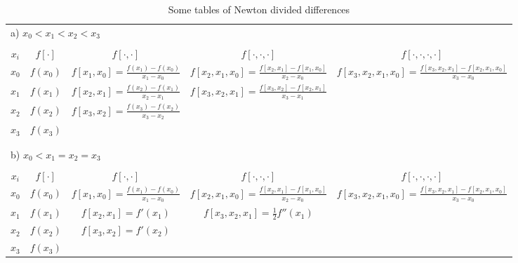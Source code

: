 \begin{table}
\begin{sideways}
\begin{tabular}{ccccc}
\multicolumn{5}{l}{a) $x_0 < x_1 <x_2 < x_3$} \\
&&&&\\
$\displaystyle x_i$ & $\displaystyle f[\cdot] $ &
$\displaystyle f[\cdot,\cdot]$ &
$\displaystyle f[\cdot,\cdot,\cdot]$ &
$\displaystyle f[\cdot,\cdot,\cdot,\cdot]$ \\
\hline
\rule{0em}{2em} $\displaystyle x_0$ & \multicolumn{1}{|c}{$\displaystyle
  f(x_0)$} &
\multicolumn{1}{|c}{$\displaystyle f[x_1,x_0] =
  \frac{f(x_1)-f(x_0)}{x_1-x_0}$} &
\multicolumn{1}{|c}{$\displaystyle
  f[x_2,x_1,x_0]=\frac{f[x_2,x_1]-f[x_1,x_0]}{x_2-x_0}$} &
\multicolumn{1}{|c|}{$\displaystyle f[x_3,x_2,x_1,x_0] =
\frac{f[x_3,x_2,x_1]-f[x_2,x_1,x_0]}{x_3-x_0}$} \\[1em]
\cline{2-5}
\rule{0em}{2em} $\displaystyle x_1$ & $\displaystyle f(x_1)$ &
$\displaystyle f[x_2,x_1] = \frac{f(x_2)-f(x_1)}{x_2-x_1}$ &
$\displaystyle f[x_3,x_2,x_1] = \frac{f[x_3,x_2]-f[x_2,x_1]}{x_3-x_1}$
& \\[1em]
\rule{0em}{2em} $\displaystyle x_2$ & $\displaystyle f(x_2)$ &
$\displaystyle f[x_3,x_2] = \frac{f(x_3)-f(x_2)}{x_3-x_2}$ & & \\[1em]
$\displaystyle x_3$ & $\displaystyle f(x_3)$ & & & \\
&&&&\\
&&&&\\
\multicolumn{5}{l}{b) $x_0 < x_1 =x_2 = x_3$} \\
&&&&\\
$\displaystyle x_i$ & $\displaystyle f[\cdot] $ &
$\displaystyle f[\cdot,\cdot]$ &
$\displaystyle f[\cdot,\cdot,\cdot]$ &
$\displaystyle f[\cdot,\cdot,\cdot,\cdot]$ \\
\hline
\rule{0em}{2em} $\displaystyle x_0$ & \multicolumn{1}{|c}{$\displaystyle
  f(x_0)$} &
\multicolumn{1}{|c}{$\displaystyle f[x_1,x_0] =
  \frac{f(x_1)-f(x_0)}{x_1-x_0}$} &
\multicolumn{1}{|c}{$\displaystyle
  f[x_2,x_1,x_0]=\frac{f[x_2,x_1]-f[x_1,x_0]}{x_2-x_0}$} &
\multicolumn{1}{|c|}{$\displaystyle f[x_3,x_2,x_1,x_0] =
\frac{f[x_3,x_2,x_1]-f[x_2,x_1,x_0]}{x_3-x_0}$} \\[1em]
\cline{2-5}
\rule{0em}{2em} $\displaystyle x_1$ & $\displaystyle f(x_1)$ &
$\displaystyle f[x_2,x_1] = f'(x_1)$ &
$\displaystyle f[x_3,x_2,x_1] = \frac{1}{2} f''(x_1)$
& \\[1em]
\rule{0em}{2em} $\displaystyle x_2$ & $\displaystyle f(x_2)$ &
$\displaystyle f[x_3,x_2] = f'(x_2)$ & & \\[1em]
$\displaystyle x_3$ & $\displaystyle f(x_3)$ & & &
\end{tabular}
\end{sideways}
\caption{Some tables of Newton divided differences}\label{TNDDFormulae}
\end{table}


